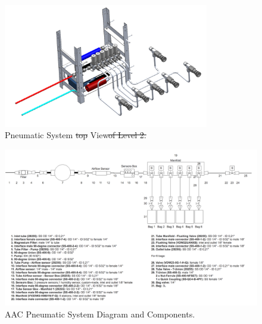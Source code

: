 \documentclass[a4paper,12pt,twoside]{article}
\providecommand{\DIFaddtex}[1]{{\protect\color{blue}\uwave{#1}}} %
\providecommand{\DIFdeltex}[1]{{\protect\color{red}\sout{#1}}}                      %
\providecommand{\DIFaddbegin}{} %
\providecommand{\DIFaddend}{} %
\providecommand{\DIFaddFL}[1]{\DIFadd{#1}} %
\providecommand{\DIFdelFL}[1]{\DIFdel{#1}} %
\providecommand{\DIFaddbeginFL}{} %
\providecommand{\DIFaddendFL}{} %
\providecommand{\DIFdelbeginFL}{} %
\providecommand{\DIFdelendFL}{} %
\providecommand{\DIFadd}[1]{\texorpdfstring{\DIFaddtex{#1}}{#1}} %
\providecommand{\DIFdel}[1]{\texorpdfstring{\DIFdeltex{#1}}{}} %
\newcommand{\DIFscaledelfig}{0.5}
\newlength{\DIFdelgraphicswidth} %
\newlength{\DIFdelgraphicsheight} %
\newcommand{\DIFaddincludegraphics}[2][]{{\color{blue}\fbox{\DIFOincludegraphics[#1]{#2}}}} %
\newcommand{\DIFdelincludegraphics}[2][]{%
\sbox{\DIFdelgraphicsbox}{\DIFOincludegraphics[#1]{#2}}%
\settoboxwidth{\DIFdelgraphicswidth}{\DIFdelgraphicsbox} %
\settoboxtotalheight{\DIFdelgraphicsheight}{\DIFdelgraphicsbox} %
\scalebox{\DIFscaledelfig}{%
\parbox[b]{\DIFdelgraphicswidth}{\usebox{\DIFdelgraphicsbox}\\[-\baselineskip] \rule{\DIFdelgraphicswidth}{0em}}\llap{\resizebox{\DIFdelgraphicswidth}{\DIFdelgraphicsheight}{%
\setlength{\unitlength}{\DIFdelgraphicswidth}%
\begin{picture}(1,1)%
\thicklines\linethickness{2pt} %
{\color[rgb]{1,0,0}\put(0,0){\framebox(1,1){}}}%
{\color[rgb]{1,0,0}\put(0,0){\line( 1,1){1}}}%
{\color[rgb]{1,0,0}\put(0,1){\line(1,-1){1}}}%
\end{picture}%
}\hspace*{3pt}}} %
} %
\DeclareRobustCommand{\DIFaddbegin}{\DIFOaddbegin \let\includegraphics\DIFaddincludegraphics} %
\DeclareRobustCommand{\DIFaddend}{\DIFOaddend \let\includegraphics\DIFOincludegraphics} %
\DeclareRobustCommand{\DIFaddbeginFL}{\DIFOaddbeginFL \let\includegraphics\DIFaddincludegraphics} %
\DeclareRobustCommand{\DIFaddendFL}{\DIFOaddendFL \let\includegraphics\DIFOincludegraphics} %
\DeclareRobustCommand{\DIFdelbeginFL}{\DIFOdelbeginFL \let\includegraphics\DIFdelincludegraphics} %
\DeclareRobustCommand{\DIFdelendFL}{\DIFOaddendFL \let\includegraphics\DIFOincludegraphics} %
\begin{document}
\begin{figure}[H]
    \centering
   \DIFdelbeginFL %
\DIFdelendFL \DIFaddbeginFL \includegraphics[width=0.8\textwidth]{4-experiment-design/img/Mechanical/Pneumatic_System.png}
   \DIFaddendFL \caption{Pneumatic System \DIFdelbeginFL \DIFdelFL{top }\DIFdelendFL \DIFaddbeginFL \DIFaddFL{Top }\DIFaddendFL View\DIFdelbeginFL \DIFdelFL{of Level 2.}\DIFdelendFL \DIFaddbeginFL \DIFaddFL{.}\DIFaddendFL }
    \DIFdelbeginFL %
\DIFdelendFL \DIFaddbeginFL \label{pneumatic_system_cad}
\DIFaddendFL \end{figure}

\DIFaddbegin 

\DIFaddend %

\newpage
\begin{landscape}
\begin{figure}[H]
    \centering
    \DIFdelbeginFL %
\DIFdelendFL \DIFaddbeginFL \includegraphics[width=1.45\textwidth]{4-experiment-design/img/Mechanical/AAC_Subsystem.png}
    \DIFaddendFL \caption{AAC Pneumatic System Diagram and Components.}
    \label{pneumatic_system}
\end{figure}
\end{landscape}
\end{document}
